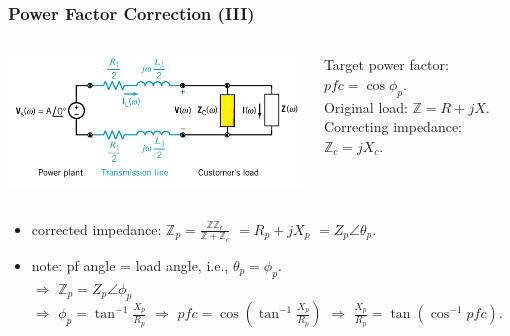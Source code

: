 \documentclass{beamer}
\begin{document}

\begin{frame}[fragile]
\frametitle{Power Factor Correction (III)}

\vspace{-1cm}
\begin{columns}[c]
\includegraphics[width=\textwidth]{src/pfc0.png}

Target power factor: $pfc = \cos \phi_p$.
\\
Original load: $\mathbb{Z} = R + jX$.
Correcting impedance: $\mathbb{Z}_c = jX_c$.
\end{columns}

\begin{itemize}
\item corrected impedance: $\mathbb{Z}_p = \frac{\mathbb{Z} \mathbb{Z}_c}{\mathbb{Z} + \mathbb{Z}_c}$
$= R_p +jX_p$
$=Z_p \angle \theta_p$.
\item note: pf angle = load angle, i.e., $\theta_p = \phi_p$.
\\
$\Rightarrow$
$\mathbb{Z}_p = Z_p \angle \phi_p$
\\
$\Rightarrow$ $\phi_p = \tan^{-1} \frac{X_p}{R_p}$
$\Rightarrow$
$pfc = \cos( \tan^{-1} \frac{X_p}{R_p} )$
$\Rightarrow$
$\frac{X_p}{R_p} = \tan ( \cos^{-1} pfc )$.
\end{itemize}

\end{frame}

\end{document}
